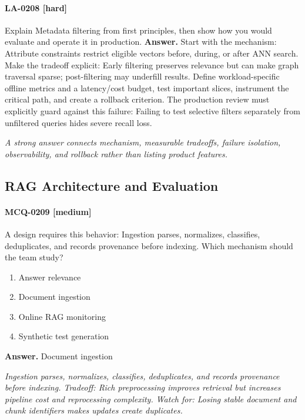 \paragraph{LA-0208 [hard]} Explain Metadata filtering from first principles, then show how you would evaluate and operate it in production.
\noindent\textbf{Answer.} Start with the mechanism: Attribute constraints restrict eligible vectors before, during, or after ANN search. Make the tradeoff explicit: Early filtering preserves relevance but can make graph traversal sparse; post-filtering may underfill results. Define workload-specific offline metrics and a latency/cost budget, test important slices, instrument the critical path, and create a rollback criterion. The production review must explicitly guard against this failure: Failing to test selective filters separately from unfiltered queries hides severe recall loss.
\par\textit{A strong answer connects mechanism, measurable tradeoffs, failure isolation, observability, and rollback rather than listing product features.}
\subsection{RAG Architecture and Evaluation}
\paragraph{MCQ-0209 [medium]} A design requires this behavior: Ingestion parses, normalizes, classifies, deduplicates, and records provenance before indexing. Which mechanism should the team study?
\begin{enumerate}[label=\Alph*.]
\item Answer relevance
\item Document ingestion
\item Online RAG monitoring
\item Synthetic test generation
\end{enumerate}
\noindent\textbf{Answer.} Document ingestion
\par\textit{Ingestion parses, normalizes, classifies, deduplicates, and records provenance before indexing. Tradeoff: Rich preprocessing improves retrieval but increases pipeline cost and reprocessing complexity. Watch for: Losing stable document and chunk identifiers makes updates create duplicates.}

